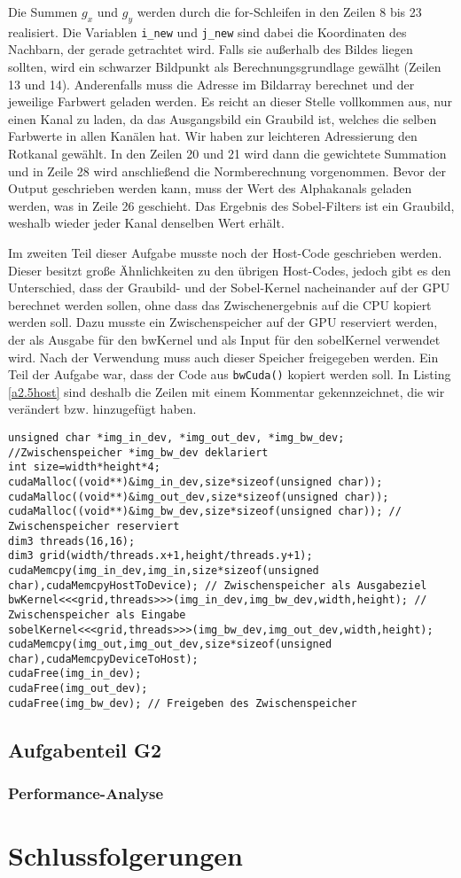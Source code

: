 \documentclass[12pt,a4paper]{scrartcl}
\begin{document}
Die Summen $g_x$ und $g_y$ werden durch die for-Schleifen in den Zeilen 8 bis 23 realisiert.
Die Variablen \texttt{i\_new} und \texttt{j\_new} sind dabei die Koordinaten des Nachbarn, der gerade getrachtet wird.
Falls sie au\ss erhalb des Bildes liegen sollten, wird ein schwarzer Bildpunkt als Berechnungsgrundlage gew\"alht (Zeilen 13 und 14).
Anderenfalls muss die Adresse im Bildarray berechnet und der jeweilige Farbwert geladen werden.
Es reicht an dieser Stelle vollkommen aus, nur einen Kanal zu laden, da das Ausgangsbild ein Graubild ist, welches die selben Farbwerte in allen Kan\"alen hat.
Wir haben zur leichteren Adressierung den Rotkanal gew\"ahlt.
In den Zeilen 20 und 21 wird dann die gewichtete Summation und in Zeile 28 wird anschlie\ss end die Normberechnung vorgenommen.
Bevor der Output geschrieben werden kann, muss der Wert des Alphakanals geladen werden, was in Zeile 26 geschieht.
Das Ergebnis des Sobel-Filters ist ein Graubild, weshalb wieder jeder Kanal denselben Wert erh\"alt.

Im zweiten Teil dieser Aufgabe musste noch der Host-Code geschrieben werden.
Dieser besitzt gro\ss e \"Ahnlichkeiten zu den \"ubrigen Host-Codes, jedoch gibt es den Unterschied, dass der Graubild- und der Sobel-Kernel nacheinander auf der GPU berechnet werden sollen, ohne dass das Zwischenergebnis auf die CPU kopiert werden soll.
Dazu musste ein Zwischenspeicher auf der GPU reserviert werden, der als Ausgabe f\"ur den bwKernel und als Input f\"ur den sobelKernel verwendet wird.
Nach der Verwendung muss auch dieser Speicher freigegeben werden.
Ein Teil der Aufgabe war, dass der Code aus \texttt{bwCuda()} kopiert werden soll.
In Listing \ref{a2.5host} sind deshalb die Zeilen mit einem Kommentar gekennzeichnet, die wir ver\"andert bzw. hinzugef\"ugt haben.

\begin{lstlisting}[caption=sobelCuda,label=a2.5host,breaklines=true]
unsigned char *img_in_dev, *img_out_dev, *img_bw_dev; //Zwischenspeicher *img_bw_dev deklariert
int size=width*height*4;
cudaMalloc((void**)&img_in_dev,size*sizeof(unsigned char));
cudaMalloc((void**)&img_out_dev,size*sizeof(unsigned char));
cudaMalloc((void**)&img_bw_dev,size*sizeof(unsigned char)); // Zwischenspeicher reserviert
dim3 threads(16,16);
dim3 grid(width/threads.x+1,height/threads.y+1);
cudaMemcpy(img_in_dev,img_in,size*sizeof(unsigned char),cudaMemcpyHostToDevice); // Zwischenspeicher als Ausgabeziel
bwKernel<<<grid,threads>>>(img_in_dev,img_bw_dev,width,height); // Zwischenspeicher als Eingabe
sobelKernel<<<grid,threads>>>(img_bw_dev,img_out_dev,width,height);
cudaMemcpy(img_out,img_out_dev,size*sizeof(unsigned char),cudaMemcpyDeviceToHost);
cudaFree(img_in_dev);
cudaFree(img_out_dev);
cudaFree(img_bw_dev); // Freigeben des Zwischenspeicher
\end{lstlisting}

\subsection{Aufgabenteil G2}

\subsubsection{Performance-Analyse}

\section{Schlussfolgerungen}
\end{document}
